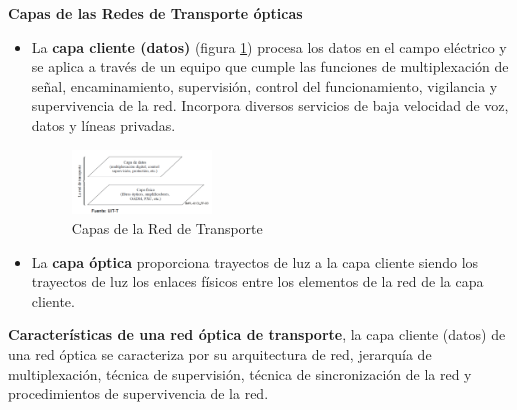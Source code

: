 \documentclass[10pt,portrait, twocolumn]{article}
\begin{document}

 \textbf{Capas de las Redes de Transporte ópticas}\\
  
\begin{itemize}
\item La \textbf{capa cliente (datos)} (figura \ref{fig:capasTransporte}) procesa los datos en el campo eléctrico y se aplica a través de un equipo que cumple las funciones de multiplexación de señal, encaminamiento, supervisión, control del funcionamiento, vigilancia y supervivencia de la red. Incorpora diversos servicios de baja velocidad de voz, datos y líneas privadas.

\begin{figure}[h!]
	\centering
     \includegraphics[width=0.35\textwidth]{Capa}
      \caption{Capas de la Red de Transporte}
      \label{fig:capasTransporte}
  \end{figure}
  
\item  La \textbf{capa óptica} proporciona trayectos de luz a la capa cliente siendo los trayectos de luz los enlaces físicos entre los elementos de la red de la capa cliente.
\end{itemize}  
 
\textbf{Características de una red óptica de transporte}, la capa cliente (datos) de una red óptica se caracteriza por su arquitectura de red, jerarquía de multiplexación, técnica de supervisión, técnica de sincronización de la red y procedimientos de supervivencia de la red. 
\end{document}
